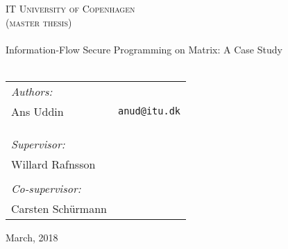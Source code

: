 \begin{center}
  \thispagestyle{empty}

  \textsc{\LARGE IT University of Copenhagen}\\[0.5cm]
  \textsc{\Large  (master thesis)}\\[2cm]

  \HRule\\[0.4cm]
  {\Huge \sffamily Information-Flow Secure Programming on Matrix: A Case Study \\ [0.4cm]}
  \HRule\\[3cm]

  \begin{tabular}{lr}
  	\textit{Authors:} \\
    Ans Uddin                     & \texttt{anud@itu.dk} \\
    \\
    \\
    \\
    \textit{Supervisor:}\\
    Willard Rafnsson \\
    \\
    \textit{Co-supervisor:}\\
    Carsten Schürmann\\
  \end{tabular}

  \vfill
  {\large March, 2018}
\end{center}
